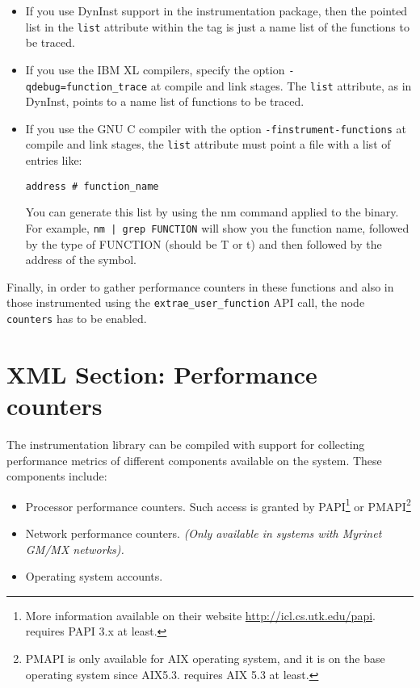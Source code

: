 \begin{itemize}
 \item If you use DynInst support in the instrumentation package, then the pointed list in the {\tt list} attribute within the tag is just a name list of the functions to be traced.

 \item If you use the IBM XL compilers, specify the option {\tt -qdebug=function\_trace} at compile and link stages. The {\tt list} attribute, as in DynInst, points to a name list of functions to be traced.

 \item If you use the GNU C compiler with the option {\tt -finstrument-functions} at compile and link stages, the {\tt list} attribute must point a file with a list of entries like:

{\tt address \# function\_name}

You can generate this list by using the nm command applied to the binary. For example, {\tt nm | grep FUNCTION} will show you the function name, followed by the type of FUNCTION (should be T or t) and then followed by the address of the symbol.
\end{itemize}

Finally, in order to gather performance counters in these functions and also in those instrumented using the {\tt extrae\_user\_function} API call, the node {\tt counters} has to be enabled.


\section{XML Section: Performance counters}\label{sec:XMLSectionPerformanceCounters}

The instrumentation library can be compiled with support for collecting performance metrics of different components available on the system. These components include:

\begin{itemize}
 \item Processor performance counters. Such access is granted by PAPI\footnote{More information available on their website \url{http://icl.cs.utk.edu/papi}. \TRACE requires PAPI 3.x at least.} or PMAPI\footnote{PMAPI is only available for AIX operating system, and it is on the base operating system since AIX5.3. \TRACE requires AIX 5.3 at least.}
 \item Network performance counters. {\em (Only available in systems with Myrinet GM/MX networks).}
 \item Operating system accounts.
\end{itemize}

